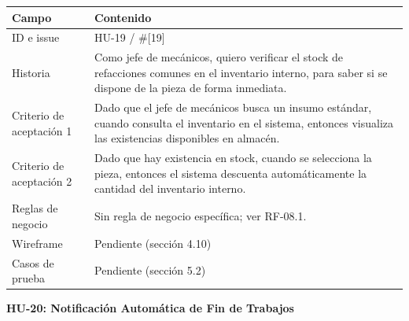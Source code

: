 {\def\LTcaptype{none} %
\begin{longtable}[]{@{}
  >{\raggedright\arraybackslash}p{}
  >{\raggedright\arraybackslash}p{}@{}}
\toprule\noalign{}
\begin{minipage}[b]{\linewidth}\raggedright
\textbf{Campo}
\end{minipage} & \begin{minipage}[b]{\linewidth}\raggedright
\textbf{Contenido}
\end{minipage} \\
\midrule\noalign{}
\endhead
\bottomrule\noalign{}
\endlastfoot
ID e issue & HU-19 / \#{[}19{]} \\
Historia & Como jefe de mecánicos, quiero verificar el stock de
refacciones comunes en el inventario interno, para saber si se dispone
de la pieza de forma inmediata. \\
Criterio de aceptación 1 & Dado que el jefe de mecánicos busca un insumo
estándar, cuando consulta el inventario en el sistema, entonces
visualiza las existencias disponibles en almacén. \\
Criterio de aceptación 2 & Dado que hay existencia en stock, cuando se
selecciona la pieza, entonces el sistema descuenta automáticamente la
cantidad del inventario interno. \\
Reglas de negocio & Sin regla de negocio específica; ver RF-08.1. \\
Wireframe & Pendiente (sección 4.10) \\
Casos de prueba & Pendiente (sección 5.2) \\
\end{longtable}
}

\textbf{HU-20: Notificación Automática de Fin de Trabajos}

